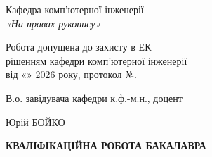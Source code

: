 
\iftrue
\begin{titlepage}
\thispagestyle{empty}

\begin{center}

\vspace{0.1cm}

\end{center}

\vspace{0.2cm}

\begin{flushright}
Кафедра комп'ютерної інженерії\\
\textit{«На правах рукопису»}
\end{flushright}

\vspace{0.2cm}

\noindent
Робота допущена до захисту в ЕК\\
рішенням кафедри комп'ютерної інженерії\\
від «\underline{\hspace{1cm}}» \underline{\hspace{2.5cm}} 2026 року, протокол №\underline{\hspace{1cm}}.

\vspace{0.1cm}

\noindent
В.о. завідувача кафедри к.ф.-м.н., доцент

\vspace{0.1cm}

\noindent
\underline{\hspace{4cm}} Юрій БОЙКО

\vspace{0.2cm}

\begin{center}
\textbf{\large КВАЛІФІКАЦІЙНА РОБОТА БАКАЛАВРА}


\end{center}
\end{titlepage}

